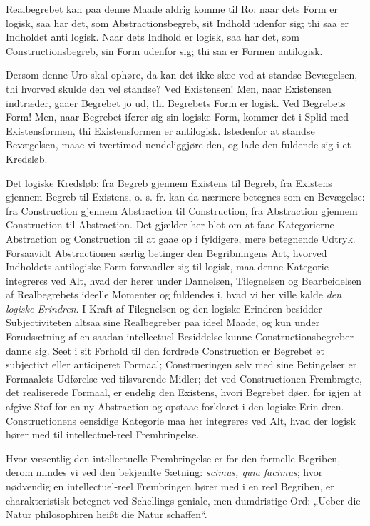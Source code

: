 \documentclass[11pt]{book}
\newcommand{\opage}[1]{\marginnote{\footnotesize\textit{[#1]}}}
\begin{document}
Realbegrebet kan paa denne Maade aldrig komme til Ro: naar dets Form
er logisk, saa har det, som Abstractionsbegreb, sit Indhold udenfor
sig; thi saa er Indholdet anti\-%
\opage{169} \setcounter{footnote}{0}%
logisk. Naar dets Indhold er logisk, saa har det, som
Constructionsbegreb, sin Form udenfor sig; thi saa er Formen
antilogisk.

Dersom denne Uro skal ophøre, da kan det ikke skee ved at standse
Bevægelsen, thi hvorved skulde den vel standse? Ved Existensen! Men,
naar Existensen indtræder, gaaer Begrebet jo ud, thi Begrebets Form er
logisk. Ved Begrebets Form! Men, naar Begrebet ifører sig sin logiske
Form, kommer det i Splid med Existensformen, thi Existensformen er
antilogisk. Istedenfor at standse Bevægelsen, maae vi tvertimod
uendeliggjøre den, og lade den fuldende sig i et Kredsløb.

Det logiske Kredsløb: fra Begreb gjennem Existens til Begreb, fra
Existens gjennem Begreb til Existens, o. s. fr. kan da nærmere
betegnes som en Bevægelse: fra Construction gjennem Abstraction til
Construction, fra Abstraction gjennem Construction til Abstraction.
Det gjælder her blot om at faae Kategorierne Abstraction og
Construction til at gaae op i fyldigere, mere betegnende Udtryk.
Forsaavidt Abstractionen særlig betinger den Begribningens Act,
hvorved Indholdets antilogiske Form forvandler sig til logisk, maa
denne Kategorie integreres ved Alt, hvad der hører under Dannelsen,
Tilegnelsen og Bearbeidelsen af Realbegrebets ideelle Momenter og
fuldendes i, hvad vi her ville kalde \emph{den logiske Erindren}. I
Kraft af Tilegnelsen og den logiske Erindren besidder Subjectiviteten
altsaa sine Realbegreber paa ideel Maade, og kun under Forudsætning af
en saadan intellectuel Besiddelse kunne Constructionsbegreber danne
sig. Seet i sit Forhold til den fordrede Construction er Begrebet et
subjectivt eller anticiperet Formaal; Construeringen selv med sine
Betingelser er Formaalets Udførelse ved tilsvarende Midler; det ved
Constructionen Frembragte, det realiserede Formaal, er endelig den
Existens, hvori Begrebet døer, for igjen at afgive Stof for en ny
Abstraction og opstaae forklaret i den logiske Erin\-%
\opage{170} \setcounter{footnote}{0}%
dren. Constructionens eensidige Kategorie maa her integreres ved Alt,
hvad der logisk hører med til intellectuel-reel Frembringelse.

Hvor væsentlig den intellectuelle Frembringelse er for den formelle
Begriben, derom mindes vi ved den bekjendte Sætning: \textit{scimus,
quia facimus}; hvor nødvendig en intellectuel-reel Frembringen hører
med i en reel Begriben, er charakteristisk betegnet ved Schellings
geniale, men dumdristige Ord: „Ueber die Natur philosophiren heißt die
Natur schaffen“.
\end{document}
